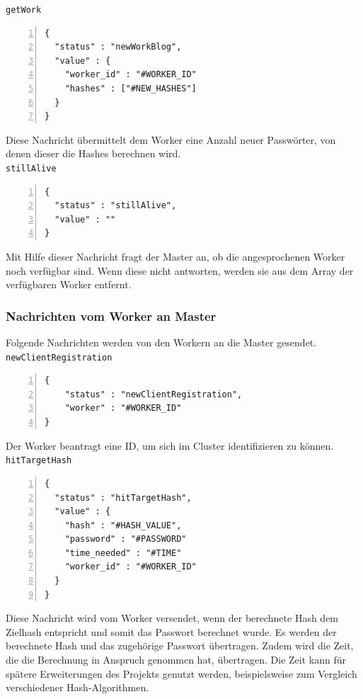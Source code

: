 \texttt{getWork}
\begin{lstlisting}[basicstyle=\ttfamily,numbers=left,numberstyle=\footnotesize\ttfamily,backgroundcolor=\color{sourcegray}]
{
  "status" : "newWorkBlog",
  "value" : {
    "worker_id" : "#WORKER_ID"
    "hashes" : ["#NEW_HASHES"]
  }
}\end{lstlisting}
Diese Nachricht übermittelt dem Worker eine Anzahl neuer Passwörter, von denen dieser die Hashes berechnen wird.\\

\texttt{stillAlive}
\begin{lstlisting}[basicstyle=\ttfamily,numbers=left,numberstyle=\footnotesize\ttfamily,backgroundcolor=\color{sourcegray}]
{
  "status" : "stillAlive",
  "value" : ""
}
\end{lstlisting}
Mit Hilfe dieser Nachricht fragt der Master an, ob die angesprochenen Worker noch verfügbar sind. Wenn diese nicht antworten, werden sie aus dem Array der verfügbaren Worker entfernt.


\subsubsection{Nachrichten vom Worker an Master}
Folgende Nachrichten werden von den Workern an die Master gesendet. \\

\texttt{newClientRegistration}
\begin{lstlisting}[basicstyle=\ttfamily,numbers=left,numberstyle=\footnotesize\ttfamily,backgroundcolor=\color{sourcegray}]
{
  	"status" : "newClientRegistration",
	"worker" : "#WORKER_ID"
}
\end{lstlisting}
Der Worker beantragt eine ID, um sich im Cluster identifizieren zu können.\\

\texttt{hitTargetHash}
\begin{lstlisting}[basicstyle=\ttfamily,numbers=left,numberstyle=\footnotesize\ttfamily,backgroundcolor=\color{sourcegray}]
{
  "status" : "hitTargetHash",
  "value" : {
    "hash" : "#HASH_VALUE",
    "password" : "#PASSWORD"
    "time_needed" : "#TIME"
    "worker_id" : "#WORKER_ID"
  }
}\end{lstlisting}
Diese Nachricht wird vom Worker versendet, wenn der berechnete Hash dem Zielhash entspricht und somit das Passwort berechnet wurde. Es werden der berechnete Hash und das zugehörige Passwort übertragen. Zudem wird die Zeit, die die Berechnung in Anspruch genommen hat, übertragen. Die Zeit kann für spätere Erweiterungen des Projekts genutzt werden, beispielsweise zum Vergleich verschiedener Hash-Algorithmen.\\

